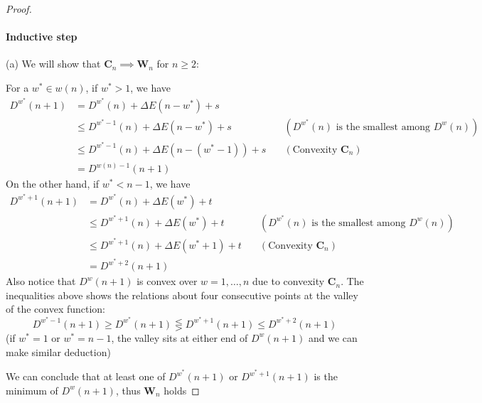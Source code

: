 \documentclass[]{article}
\begin{document}
\begin{proof}
\paragraph{Inductive step} (a) We will show that $\mathbf{C}_n \implies \mathbf{W}_n$ for $n\ge 2$:

For a $w^*\in w(n)$, if $w^* >1$, we have
\begin{align*}
D^{w^*}(n+1) &= D^{w^*}(n) + \Delta E(n-w^*) +s\\
&\le  D^{w^* - 1}(n) + \Delta E(n-w^*) +s \quad &(\text{$D^{w^*}(n)$ is the smallest among $D^{w}(n)$})\\
&\le  D^{w^* - 1}(n) + \Delta E(n-(w^*-1)) +s \quad &(\text{Convexity $\mathbf{C}_{n}$}) \\
&=D^{w(n)-1}(n+1)
\end{align*}
On the other hand, if $w^* < n -1$, we have
\begin{align*}
D^{w^*+1}(n+1) &= D^{w^*}(n) + \Delta E(w^*) +t \\
&\le  D^{w^* + 1}(n) + \Delta E(w^*) +t \quad &(\text{$D^{w^*}(n)$ is the smallest among $D^{w}(n)$})\\
&\le  D^{w^* + 1}(n) + \Delta E(w^* + 1) +t \quad &(\text{Convexity $\mathbf{C}_{n}$}) \\
&= D^{w^*+2}(n+1)
\end{align*}
Also notice that $D^w(n+1)$ is convex over $w=1,\dots,n$ due to convexity $\mathbf{C}_{n}$. The inequalities above shows the relations about four consecutive points at the valley of the convex function:
\[
D^{w^*-1}(n+1) \ge D^{w^*}(n+1) \lesseqgtr D^{w^*+1}(n+1) \le D^{w^*+2}(n+1)
\]
(if $w^* = 1$ or $w^* = n-1$, the valley sits at either end of $D^w(n+1)$ and we can make similar deduction)

We can conclude that at least one of $D^{w^*}(n+1)$ or $D^{w^*+1}(n+1)$ is the minimum of $D^w(n+1)$, thus $\mathbf{W}_n$ holds


\end{proof}
\end{document}

